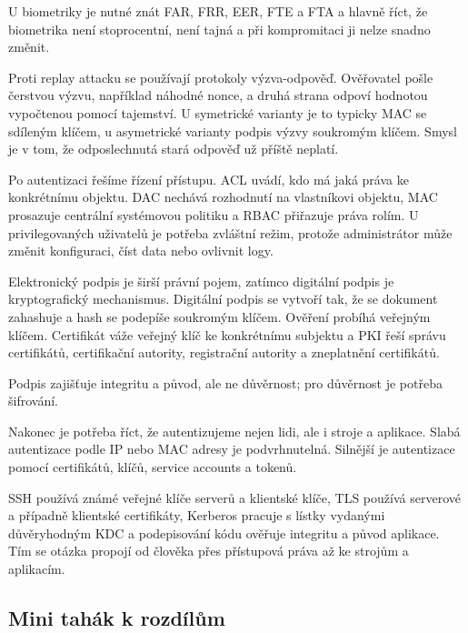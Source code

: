 \documentclass[11pt,a4paper]{article}
\begin{document}
U biometriky je nutné znát FAR, FRR, EER, FTE a FTA a hlavně říct, že biometrika není stoprocentní, není tajná a při kompromitaci ji nelze snadno změnit.

Proti replay attacku se používají protokoly výzva-odpověď. Ověřovatel pošle čerstvou výzvu, například náhodné nonce, a druhá strana odpoví hodnotou vypočtenou pomocí tajemství. U symetrické varianty je to typicky MAC se sdíleným klíčem, u asymetrické varianty podpis výzvy soukromým klíčem. Smysl je v tom, že odposlechnutá stará odpověď už příště neplatí.

Po autentizaci řešíme řízení přístupu. ACL uvádí, kdo má jaká práva ke konkrétnímu objektu. DAC nechává rozhodnutí na vlastníkovi objektu, MAC prosazuje centrální systémovou politiku a RBAC přiřazuje práva rolím. U privilegovaných uživatelů je potřeba zvláštní režim, protože administrátor může změnit konfiguraci, číst data nebo ovlivnit logy.

Elektronický podpis je širší právní pojem, zatímco digitální podpis je kryptografický mechanismus. Digitální podpis se vytvoří tak, že se dokument zahashuje a hash se podepíše soukromým klíčem. Ověření probíhá veřejným klíčem. Certifikát váže veřejný klíč ke konkrétnímu subjektu a PKI řeší správu certifikátů, certifikační autority, registrační autority a zneplatnění certifikátů.

Podpis zajišťuje integritu a původ, ale ne důvěrnost; pro důvěrnost je potřeba šifrování.

Nakonec je potřeba říct, že autentizujeme nejen lidi, ale i stroje a aplikace. Slabá autentizace podle IP nebo MAC adresy je podvrhnutelná. Silnější je autentizace pomocí certifikátů, klíčů, service accounts a tokenů.

SSH používá známé veřejné klíče serverů a klientské klíče, TLS používá serverové a případně klientské certifikáty, Kerberos pracuje s lístky vydanými důvěryhodným KDC a podepisování kódu ověřuje integritu a původ aplikace. Tím se otázka propojí od člověka přes přístupová práva až ke strojům a aplikacím.

\subsection*{Mini tahák k rozdílům}
\end{document}
